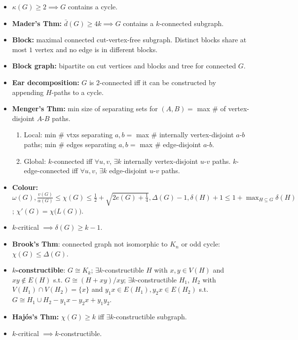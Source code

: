 \documentclass[10pt]{article}
\begin{document}
\begin{multicols*}{3}
\begin{itemize}
            \item $\kappa(G) \geq 2 \implies G$ contains a cycle. 
            \item \textbf{Mader's Thm:} $\bar{d}(G) \geq 4k \implies G$ contains a $k$-connected subgraph.
            \item \textbf{Block:} maximal connected cut-vertex-free subgraph. Distinct blocks share at most $1$ vertex and no edge is in different blocks.
            \item \textbf{Block graph:} bipartite on cut vertices and blocks and tree for connected $G$.
            \item \textbf{Ear decomposition:} $G$ is $2$-connected iff it can be constructed by appending $H$-paths to a cycle.
            \item \textbf{Menger's Thm:} min size of separating sets for $(A, B) =$ max \# of vertex-disjoint $A$-$B$ paths.
            \begin{enumerate}
                \item Local: min \# vtxs separating $a, b =$  max \# internally vertex-disjoint $a$-$b$ paths; min \# edges separating $a, b =$ max \# edge-disjoint $a$-$b$.
                \item Global: $k$-connected iff $\forall u, v$, $\exists k$ internally vertex-disjoint $u$-$v$ paths. $k$-edge-connected iff $\forall u, v$, $\exists k$ edge-disjoint $u$-$v$ paths.
            \end{enumerate}
            \item \textbf{Colour:} $\omega(G), \frac{v(G)}{\alpha(G)} \leq \chi(G) \leq \frac{1}{2} + \sqrt{2e(G) + \frac{1}{4}}, \Delta(G) - 1, \delta(H) + 1 \leq 1 + \max_{H \subseteq G}\delta(H)$; $\chi'(G) = \chi\bigl(L(G)\bigr)$.
            \item $k$-critical $\implies \delta(G) \geq k - 1$.
            \item \textbf{Brook's Thm}:  connected graph not isomorphic to $K_n$ or odd cycle: $\chi(G) \leq \Delta(G)$.
            \item \textbf{$k$-constructible}: $G \cong K_k$; $\exists k$-constructible $H$ with $x, y \in V(H)$ and $xy \notin E(H)$ s.t. $G \cong (H + xy)/xy$; $\exists k$-constructible $H_1$, $H_2$ with $V(H_1) \cap V(H_2) = \{x\}$ and $y_1x \in E(H_1), y_2x \in E(H_2)$ s.t. $G \cong H_1 \cup H_2 - y_1x - y_2x + y_1y_2$.
            \item \textbf{Haj\'{o}s's Thm:} $\chi(G) \geq k$ iff $\exists k$-constructible subgraph.
            \item $k$-critical $\implies k$-constructible.

\end{itemize}
\end{multicols*}
\end{document}
